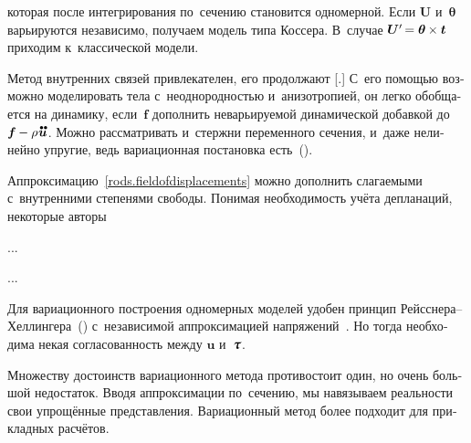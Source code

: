 \begin{otherlanguage}{russian}
\vspace{-0.1em}\noindent
которая после интегрирования по~сечению становится одномерной.
Если $\bm{U}$ и~$\bm{\theta}$ варьируются независимо, получаем модель типа Коссера.
В~случае $\bm{U}' \hspace{-0.25ex} = \bm{\theta} \hspace{-0.1ex} \times \bm{t}$ приходим к~классической модели.

Метод внутренних связей привлекателен, его продолжают [.]
С~его помощью возможно моделировать тела с~неоднородностью и~анизотропией, он легко обобщается на динамику, если~$\bm{f}$ дополнить неварьируемой динамической добавкой до~${\bm{f} \hspace{-0.1ex} - \rho \hspace{.1ex} \mathdotdotabove{\bm{u}}}$.
Можно рассматривать и~стержни переменного сечения, и~даже нелинейно упругие, ведь вариационная постановка есть~().

Аппроксимацию~\eqref{rods.fieldofdisplacements} можно дополнить слагаемыми с~внутренними степенями свободы.
Понимая необходимость учёта депланаций, некоторые авторы

...

...



Для вариационного построения одномерных моделей удобен принцип Рейсснера\hbox{--}Хеллингера~() с~независимой аппроксимацией напряжений~\cite{eliseev-models}. Но тогда необходима некая согласованность между $\bm{u}$ и~$\cauchystress$.

Множеству достоинств вариационного метода противостоит один, но очень большой недостаток.
Вводя аппроксимации по~сечению, мы навязываем реальности свои упрощённые представления.
Вариационный метод более подходит для прикладных расчётов.

\end{otherlanguage}



